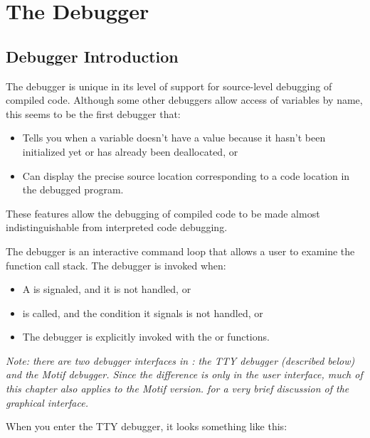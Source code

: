 \chapter{The Debugger}
\label{debugger}



\section{Debugger Introduction}

The \cmucl{} debugger is unique in its level of support for source-level
debugging of compiled code.  Although some other debuggers allow access of
variables by name, this seems to be the first \llisp{} debugger that:
\begin{itemize}

\item
Tells you when a variable doesn't have a value because it hasn't been
initialized yet or has already been deallocated, or

\item
Can display the precise source location corresponding to a code
location in the debugged program.
\end{itemize}
These features allow the debugging of compiled code to be made almost
indistinguishable from interpreted code debugging.

The debugger is an interactive command loop that allows a user to examine
the function call stack.  The debugger is invoked when:
\begin{itemize}

\item
A  is signaled, and it is not handled, or

\item
{} is called, and the condition it signals is not handled, or

\item
The debugger is explicitly invoked with the \clisp{} 
or  functions.
\end{itemize}

{\it Note: there are two debugger interfaces in \cmucl{}: the TTY
debugger (described below) and the Motif debugger. Since the
difference is only in the user interface, much of this chapter also
applies to the Motif version.  for a very brief
discussion of the graphical interface.}

When you enter the TTY debugger, it looks something like this:

